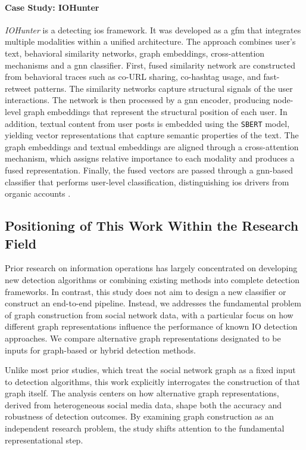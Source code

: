 \documentclass{article}
\begin{document}
\paragraph{Case Study: IOHunter} \textit{IOHunter} is a detecting \acp{io} framework. It was developed as a \ac{gfm} that integrates multiple modalities within a unified architecture. The approach combines user's text, behavioral similarity networks, graph embeddings, cross-attention mechanisms and a \ac{gnn} classifier. First, fused similarity network are constructed from behavioral traces such as co-URL sharing, co-hashtag usage, and fast-retweet patterns. The similarity networks capture structural signals of the user interactions. The network is then processed by a \ac{gnn} encoder, producing node-level graph embeddings that represent the structural position of each user. In addition, textual content from user posts is embedded using the \texttt{SBERT} model, yielding vector representations that capture semantic properties of the text. The graph embeddings and textual embeddings are aligned through a cross-attention mechanism, which assigns relative importance to each modality and produces a fused representation. Finally, the fused vectors are passed through a \ac{gnn}-based classifier that performs user-level classification, distinguishing \acp{io} drivers from organic accounts \cite{minici2025iohunter}.

\subsection{Positioning of This Work Within the Research Field}
Prior research on information operations has largely concentrated on developing new detection algorithms or combining existing methods into complete detection frameworks. In contrast, this study does not aim to design a new classifier or construct an end-to-end pipeline. Instead, we addresses the fundamental problem of graph construction from social network data, with a particular focus on how different graph representations influence the performance of known IO detection approaches. We compare alternative graph representations designated to be inputs for graph-based or hybrid detection methods.

Unlike most prior studies, which treat the social network graph as a fixed input to detection algorithms, this work explicitly interrogates the construction of that graph itself. The analysis centers on how alternative graph representations, derived from heterogeneous social media data, shape both the accuracy and robustness of detection outcomes. By examining graph construction as an independent research problem, the study shifts attention to the fundamental representational step. 
\end{document}
